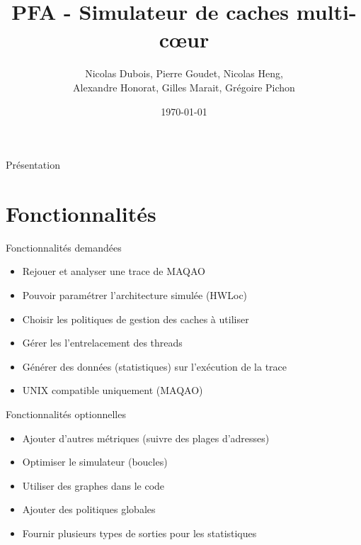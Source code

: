 \documentclass{beamer}
\title[PFA - Simulateur de caches multi-c\oe ur]{PFA - Simulateur de caches multi-c\oe ur}
\author[]{Nicolas Dubois, Pierre Goudet, Nicolas Heng,\\Alexandre Honorat, Gilles Marait, Grégoire Pichon}
\institute[ENSEIRB-MATMECA]{ENSEIRB-MATMECA}
\date{\today}
\begin{document}
\setlength{\unitlength}{1cm}

\begin{frame}{Présentation}

\titlepage

\end{frame}


\section*{Fonctionnalités}
\begin{frame}
\begin{block}{Fonctionnalités demandées}
\begin{itemize}
  \item{Rejouer et analyser une trace de MAQAO}
  \item{Pouvoir paramétrer l'architecture simulée (HWLoc)}
  \item{Choisir les politiques de gestion des caches à utiliser}
  \item{Gérer les l'entrelacement des threads}
  \item{Générer des données (statistiques) sur l'exécution de la trace}
  \item{UNIX compatible uniquement (MAQAO)}
\end{itemize}
\end{block}
\end{frame}

\begin{frame}
\begin{block}{Fonctionnalités optionnelles}
\begin{itemize}
  \item{Ajouter d'autres métriques (suivre des plages d'adresses)}
  \item{Optimiser le simulateur (boucles)}
  \item{Utiliser des graphes dans le code}
  \item{Ajouter des politiques globales}
  \item{Fournir plusieurs types de sorties pour les statistiques}
\end{itemize}
\end{block}
\end{frame}
\end{document}
